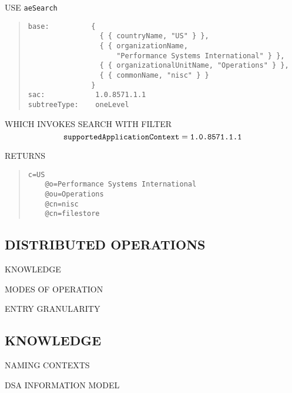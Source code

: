 \begin{bwslide}

\begin{nrtc}
\item	USE \verb"aeSearch"
\begin{quote}\small\begin{verbatim}
base:          {
                 { { countryName, "US" } },
                 { { organizationName,
                     "Performance Systems International" } },
                 { { organizationalUnitName, "Operations" } },
                 { { commonName, "nisc" } }
               }
sac:            1.0.8571.1.1
subtreeType:    oneLevel
\end{verbatim}\end{quote}
WHICH INVOKES SEARCH WITH FILTER
$$\mbox{\tt supportedApplicationContext}=\mbox{\tt 1.0.8571.1.1}$$

\item	RETURNS
\begin{quote}\small\begin{verbatim}
c=US
    @o=Performance Systems International
    @ou=Operations
    @cn=nisc
    @cn=filestore
\end{verbatim}\end{quote}
\end{nrtc}
\end{bwslide}


\begin{bwslide}
\part	{DISTRIBUTED OPERATIONS}\bf

\begin{nrtc}
\item	KNOWLEDGE

\item	MODES OF OPERATION

\item	ENTRY GRANULARITY
\end{nrtc}
\end{bwslide}


\begin{bwslide}
\part*	{KNOWLEDGE}\bf

\begin{nrtc}
\item	NAMING CONTEXTS

\item	DSA INFORMATION MODEL
\end{nrtc}
\end{bwslide}


